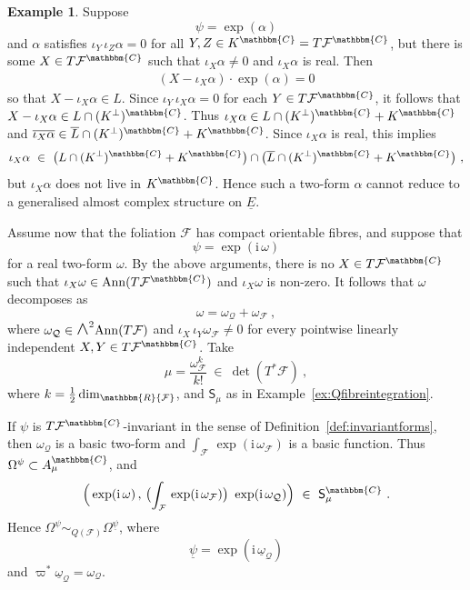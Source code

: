 \documentclass[a4paper, reqno, 11pt]{amsart}
\numberwithin{equation}{section}
\theoremstyle{definition}
\newtheorem{example}[equation]{Example}
\newcommand{\red}[1]{\underline{#1}}
\newcommand{\ii}{\mathrm{i}}
\newcommand{\IC}{\mathbbm{C}}
\newcommand{\IR}{\mathbbm{R}}
\newcommand{\cQ}{{\mathcal Q}}
\newcommand{\cF}{{\mathcal F}}
\newcommand{\sfS}{{\mathsf{S}}}
\newcommand{\midwedge}{\text {\Large$\wedge$}}
\newcommand{\ann}{\mathrm{Ann}}
\theoremstyle{remark}
\begin{document}
\begin{example}\label{ex:symplectic_red_spinors}
    Suppose $$\psi = \exp(\alpha)$$ and $\alpha$ satisfies $\iota_Y\, \iota_Z \alpha = 0$ for all $Y,Z\in K^\IC = T\cF^\IC$, but there is some $X \in T\cF^\IC$ such that $\iota_X\alpha \neq 0$ and $\iota_X \alpha$ is real. Then
    \begin{align}
        (X - \iota_X \alpha) \cdot \exp(\alpha) = 0
    \end{align}
    so that $X- \iota_X \alpha  \in L$. Since $\iota_Y\, \iota_X \alpha = 0$ for each $Y \in T\cF^\IC$, it follows that $X- \iota_X \alpha  \in L\cap (K^\perp)^\IC$. Thus $\iota_X \alpha \in L\cap (K^\perp)^\IC +K^\IC$ and $\overline{\iota_X\alpha}\in \overline{L} \cap (K^\perp)^\IC + K^\IC$. Since $\iota_X \alpha$ is real, this implies $$\iota_X \alpha \ \in \ \big(L\cap (K^\perp)^\IC +K^\IC\big)\cap\big(\overline L \cap (K^\perp)^\IC +K^\IC\big) \ , $$ but $\iota_X\alpha$ does not live in $K^\IC$. Hence such a two-form $\alpha$ cannot reduce to a generalised almost complex structure on $\red E$.
    
    Assume now that the foliation $\cF$ has compact orientable fibres, and suppose that $$\psi = \exp(\ii\,\omega)$$ for a real two-form $\omega.$
    By the above arguments, there is no $X\in T\cF^\IC$ such that $\iota_X \omega \in \ann(T\cF^\IC) $ and $\iota_X\omega$ is non-zero. 
    It follows that $\omega$ decomposes as $$\omega = \omega_\cQ + \omega_\cF \ , $$ where $\omega_\cQ \in \midwedge^2 \ann(T\cF)$ and $\iota_X\, \iota_Y \omega_\cF\neq 0$ for every pointwise linearly independent $X, Y \in T\cF^\IC$. 
    Take $$\mu = \frac{\omega_{\cF}^k}{k!} \ \in \ \det(T^*\cF) \ , $$ where $k = \frac 12\dim_\IR \cF$, and $\sfS_\mu$ as in Example~\ref{ex:Qfibreintegration}. 

     If $\psi$ is $T\cF^\IC$-invariant in the sense of Definition~\ref{def:invariantforms}, then $\omega_\cQ$ is a basic two-form and $\int_\cF\, \exp(\ii\,\omega_\cF)$ is a basic function. Thus $\Omega^\psi \subset A^\IC_\mu$, and 
     $$\Big(\exp(\ii\,\omega)\,,\, \big (\text{\footnotesize{$\int_\cF$}}\, \exp(\ii\,\omega_{\cF})\big) \ \exp(\ii\,\omega_{\cQ})\Big) \ \in \ \sfS_\mu^\IC \ . $$ Hence $\Omega^\psi \sim_{Q(\cF)} \Omega^{\red \psi}$, where $$\red \psi = \exp(\ii\,\red \omega_\cQ)$$ and $\varpi^* \red \omega_\cQ = \omega_\cQ$.
\end{example}
\end{document}
